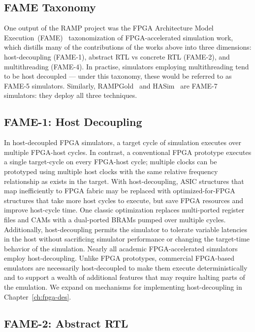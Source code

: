 \subsection{FAME Taxonomy}

One output of the RAMP project was the FPGA Architecture Model
Execution~(FAME)~\cite{FAME} taxonomization of FPGA-accelerated simulation work,
which distills many of the contributions of the works above into three
dimensions: host-decoupling (FAME-1), abstract RTL vs concrete RTL (FAME-2),
and multithreading (FAME-4). In practise, simulators employing multithreading
tend to be host decoupled --- under this taxonomy, these would be referred to as
FAME-5 simulators. Similarly, RAMPGold~\cite{RAMPGold} and HASim~\cite{HASim}
are FAME-7 simulators: they deploy all three techniques.


\subsection{FAME-1: Host Decoupling}\label{sec:fame1}

In host-decoupled FPGA simulators, a target cycle of simulation
executes over multiple FPGA-host cycles. In contrast, a
conventional FPGA prototype executes a single target-cycle on every FPGA-host
cycle; multiple clocks can be prototyped using multiple host clocks with the
same relative frequency relationship as exists in the target.
With host-decoupling, ASIC structures that map inefficiently to FPGA fabric may be replaced
with optimized-for-FPGA structures that take more host cycles to execute, but save
FPGA resources and improve host-cycle time.  One classic optimization replaces
multi-ported register files and CAMs with a dual-ported BRAMs pumped over
multiple cycles.  Additionally, host-decoupling permits the simulator to
tolerate variable latencies in the host without sacrificing simulator
performance or changing the target-time behavior of the simulation.
Nearly all academic FPGA-accelerated simulators employ host-decoupling.
Unlike FPGA prototypes, commercial FPGA-based emulators are necessarily host-decoupled to
make them execute deterministically and to support a wealth of additional features that may require
halting parts of the emulation. We expand on mechanisms for implementing host-decoupling in Chapter~\ref{ch:fpga-des}.

\subsection{FAME-2: Abstract RTL}

